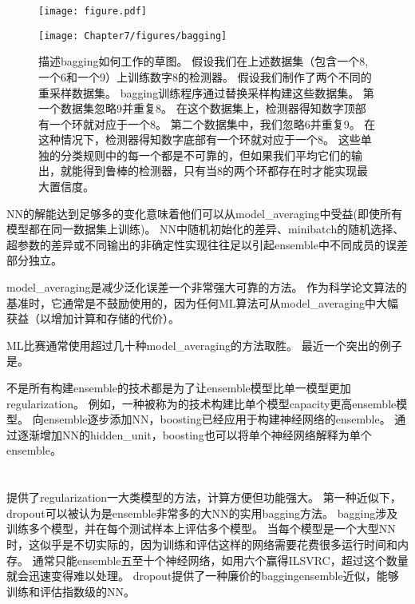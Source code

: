 \begin{figure}[!htb]
\ifOpenSource
\centerline{\texttt{[image: figure.pdf]}}
\else
\centerline{\texttt{[image: Chapter7/figures/bagging]}}
\fi
\caption{描述\gls{bagging}如何工作的草图。
假设我们在上述数据集（包含一个8,一个6和一个9）上训练数字8的检测器。
假设我们制作了两个不同的重采样数据集。
\gls{bagging}训练程序通过替换采样构建这些数据集。
第一个数据集忽略9并重复8。
在这个数据集上，检测器得知数字顶部有一个环就对应于一个8。
第二个数据集中，我们忽略6并重复9。
在这种情况下，检测器得知数字底部有一个环就对应于一个8。
这些单独的分类规则中的每一个都是不可靠的，但如果我们平均它们的输出，就能得到鲁棒的检测器，只有当8的两个环都存在时才能实现最大置信度。
}
\label{fig:chap7_bagging}
\end{figure}

\gls{NN}的解能达到足够多的变化意味着他们可以从\gls{model_averaging}中受益(即使所有模型都在同一数据集上训练)。
\gls{NN}中随机初始化的差异、\gls{minibatch}的随机选择、超参数的差异或不同输出的非确定性实现往往足以引起\gls{ensemble}中不同成员的误差部分独立。


\gls{model_averaging}是减少泛化误差一个非常强大可靠的方法。
作为科学论文算法的基准时，它通常是不鼓励使用的，因为任何\gls{ML}算法可从\gls{model_averaging}中大幅获益（以增加计算和存储的代价）。

\gls{ML}比赛通常使用超过几十种\gls{model_averaging}的方法取胜。
最近一个突出的例子是\citep{Koren09}。

不是所有构建\gls{ensemble}的技术都是为了让\gls{ensemble}模型比单一模型更加\gls{regularization}。
例如，一种被称为的技术\citep{ConfLT:Freund:gametheorie,ConfML:Freund:AdaBoostCompar}构建比单个模型\gls{capacity}更高\gls{ensemble}模型。
向\gls{ensemble}逐步添加\gls{NN}，\gls{boosting}已经应用于构建神经网络的\gls{ensemble}\citep{Schwenk-nips10}。
通过逐渐增加\gls{NN}的\gls{hidden_unit}，\gls{boosting}也可以将单个神经网络解释为单个\gls{ensemble}。

\section{}
\label{sec:dropout}
\citep{Srivastava14}提供了\gls{regularization}一大类模型的方法，计算方便但功能强大。
第一种近似下，\gls{dropout}可以被认为是\gls{ensemble}非常多的大\gls{NN}的实用\gls{bagging}方法。
\gls{bagging}涉及训练多个模型，并在每个测试样本上评估多个模型。
当每个模型是一个大型\gls{NN}时，这似乎是不切实际的，因为训练和评估这样的网络需要花费很多运行时间和内存。
通常只能\gls{ensemble}五至十个神经网络，如\cite{Szegedy-et-al-arxiv2014}用六个赢得ILSVRC，超过这个数量就会迅速变得难以处理。
\gls{dropout}提供了一种廉价的\gls{bagging}\gls{ensemble}近似，能够训练和评估指数级的\gls{NN}。

